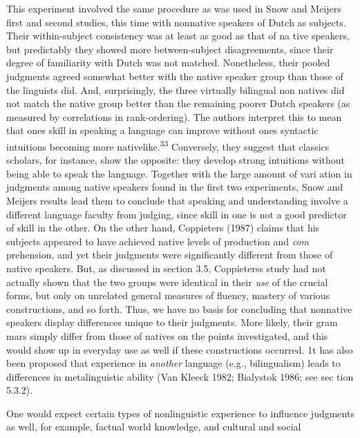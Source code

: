 \begin{styleTextbody}
This experiment involved the same procedure as was used in Snow and Meijer{\textquotesingle}s first and second studies, this time with nonnative speakers of Dutch as subjects. Their within-subject consistency was at least as good as that of na\- tive speakers, but predictably they showed more between-subject disagreements, since their degree of familiarity with Dutch was not matched. Nonetheless, their pooled judgments agreed somewhat better with the native speaker group than those of the linguists did. And, surprisingly, the three virtually bilingual non\- natives did not match the native group better than the remaining poorer Dutch speakers (as measured by correlations in rank-ordering). The authors interpret this to mean that one{\textquotesingle}s skill in speaking a language can improve without one{\textquotesingle}s syntactic intuitions becoming more nativelike.\textsuperscript{33}\textsuperscript{ }Conversely, they suggest that classics scholars, for instance, show the opposite: they develop strong intuitions without being able to speak the language. Together with the large amount of vari\- ation in judgments among native speakers found in the first two experiments, Snow and Meijer{\textquotesingle}s results lead them to conclude that speaking and understanding involve a different language faculty from judging, since skill in one is not a good predictor of skill in the other. On the other hand, Coppieters (1987) claims that his subjects appeared to have achieved native levels of production and \textit{com\- }prehension, and yet their judgments were significantly different from those of native speakers. But, as discussed in section 3.5, Coppieters{\textquotesingle}s study had not actually shown that the two groups were identical in their \textit{use}\textit{ }of the crucial forms, but only on unrelated general measures of fluency, mastery of various constructions, and so forth. Thus, we have no basis for concluding that nonnative speakers display differences unique to their judgments. More likely, their gram\- mars simply differ from those of natives on the points investigated, and this would show up in everyday use as well if these constructions occurred. 1t has also been proposed that experience in \textit{another}\textit{ }language (e.g., bilingualism) leads to differences in metalinguistic ability (Van Kleeck 1982; Bialystok 1986; see sec\- tion 5.3.2).
\end{styleTextbody}


\begin{styleTextbody}
One would expect certain types of nonlinguistic experience to influence judgments as well, for example, factual world knowledge, and cultural and social
\end{styleTextbody}


